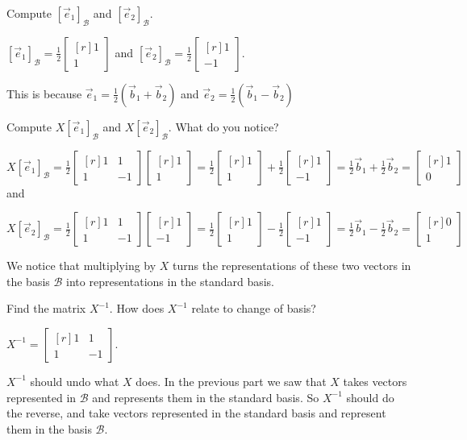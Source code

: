 \documentclass{problemset}
\newcommand{\xhat}{{\vec e_1}}
\newcommand{\yhat}{{\vec e_2}}
\newcommand{\mat}[1]{\begin{bmatrix*}[r]#1\end{bmatrix*}}
\begin{document}
	\begin{parts}
		\item Compute $[\xhat]_{\mathcal B}$ and $[\yhat]_{\mathcal B}$.
			\begin{solution}
				$[\xhat]_{\mathcal B}=\frac{1}{2}\mat{1\\1}$ and
				$[\yhat]_{\mathcal B}=\frac{1}{2}\mat{1\\-1}$.

				This is because $\xhat=\frac{1}{2}(\vec b_1+\vec b_2)$ and
				$\yhat=\frac{1}{2}(\vec b_1-\vec b_2)$
			\end{solution}
		\item Compute $X[\xhat]_{\mathcal B}$ and $X[\yhat]_{\mathcal B}$.
			What do you notice?
			\begin{solution}
				$X[\xhat]_{\mathcal B}=\frac{1}{2}\mat{1&1\\1&-1}\mat{1\\1}
				=\frac{1}{2}\mat{1\\1}+\frac{1}{2}\mat{1\\-1}
				=\frac{1}{2}\vec b_1+\frac{1}{2}\vec b_2=\mat{1\\0}$
				and

				$X[\yhat]_{\mathcal B}=\frac{1}{2}\mat{1&1\\1&-1}\mat{1\\-1}
				=\frac{1}{2}\mat{1\\1}-\frac{1}{2}\mat{1\\-1}
				=\frac{1}{2}\vec b_1-\frac{1}{2}\vec b_2=\mat{0\\1}$

				We notice that multiplying by $X$ turns the representations	of
				these two vectors in the basis $\mathcal B$ into representations
				in the standard basis.
			\end{solution}
		\item Find the matrix $X^{-1}$. How does $X^{-1}$ relate to change of basis?
			\begin{solution}
				$X^{-1}=\mat{1&1\\1&-1}$.

				$X^{-1}$ should undo what $X$ does. In the previous part we saw
				that $X$ takes vectors represented in $\mathcal B$ and represents
				them in the standard basis. So $X^{-1}$ should do the reverse, and
				take vectors represented in the standard basis and represent them
				in the basis $\mathcal B$.
			\end{solution}
	\end{parts}
\end{document}
